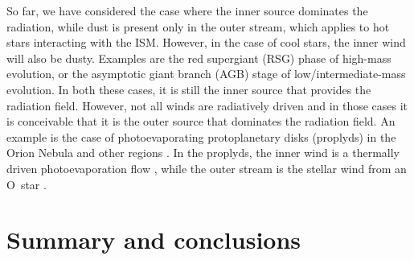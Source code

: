\message{ !name(bs-bw-dw-03.tex)}\documentclass[useAMS, usenatbib, a4paper]{mnras}
\begin{document}
So far, we have considered the case where the inner source dominates
the radiation, while dust is present only in the outer stream, which
applies to hot stars interacting with the ISM.  However, in the case
of cool stars, the inner wind will also be dusty.  Examples are the
red supergiant (RSG) phase of high-mass evolution, or the asymptotic
giant branch (AGB) stage of low/intermediate-mass evolution.  In both
these cases, it is still the inner source that provides the radiation
field.  However, not all winds are radiatively driven and in those
cases it is conceivable that it is the outer source that dominates the
radiation field.  An example is the case of photoevaporating
protoplanetary disks (proplyds) in the Orion Nebula and other \hii{}
regions \citep{ODell:1994a}.  In the proplyds, the inner wind is a
thermally driven photoevaporation flow \citep{Henney:1998b, Henney:1999a},
while the outer stream is the stellar wind from an O~star
\citep{Garcia-Arredondo:2001a}.


\section{Summary and conclusions}
\label{sec:conclusions}




\end{document}
